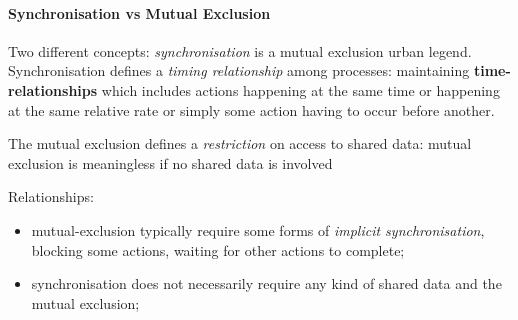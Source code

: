 \paragraph{Synchronisation vs Mutual Exclusion}\label{par:cp_synchronisation_vs_mutual_exclusion} %
Two different concepts: \textit{synchronisation} is a mutual exclusion urban legend.
Synchronisation defines a \textit{timing relationship} among processes: maintaining \textbf{time-relationships} which includes actions happening at the same time or happening at the same relative rate or simply some action having to occur before another.
\begin{note}
    The mutual exclusion defines a \textit{restriction} on access to shared data: mutual exclusion is meaningless if no shared data is involved
\end{note}
\emptyln{}
Relationships:
\begin{itemize}
    \item mutual-exclusion typically require some forms of \textit{implicit synchronisation}, blocking some actions, waiting for other actions to complete;
    \item synchronisation does not necessarily require any kind of shared data and the mutual exclusion;
\end{itemize}
